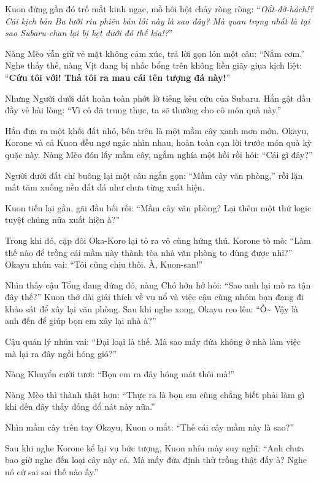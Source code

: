 \documentclass[../main.tex]{subfiles}
\begin{document}

Kuon đứng gần đó trố mắt kinh ngạc, mồ hôi hột chảy ròng ròng: ``\textit{Oắt-đờ-hách!? Cái kịch bản Ba lưỡi rìu phiên bản lỗi này là sao đây? Mà quan trọng nhất là tại sao Subaru-chan lại bị kẹt dưới đó thế kia!?}''

Nàng Mèo vẫn giữ vẻ mặt không cảm xúc, trả lời gọn lỏn một câu: ``Nắm cơm.''
Nghe thấy thế, nàng Vịt đang bị nhấc bổng trên không liền giãy giụa kịch liệt: ``\textbf{Cứu tôi với! Thả tôi ra mau cái tên tượng đá này!}''

Nhưng Người dưới đất hoàn toàn phớt lờ tiếng kêu cứu của Subaru. Hắn gật đầu đầy vẻ hài lòng: ``Vì cô đã trung thực, ta sẽ thưởng cho cô món quà này.''


Hắn đưa ra một khối đất nhỏ, bên trên là một mầm cây xanh mơn mởn. Okayu, Korone và cả Kuon đều ngơ ngác nhìn nhau, hoàn toàn cạn lời trước món quà kỳ quặc này. Nàng Mèo đón lấy mầm cây, ngắm nghía một hồi rồi hỏi: ``Cái gì đây?''

Người dưới đất chỉ buông lại một câu ngắn gọn: ``Mầm cây văn phòng,'' rồi lặn mất tăm xuống nền đất đá như chưa từng xuất hiện.

Kuon tiến lại gần, gãi đầu bối rối: ``Mầm cây văn phòng? Lại thêm một thứ logic tuyệt chủng nữa xuất hiện à?''

Trong khi đó, cặp đôi Oka-Koro lại tỏ ra vô cùng hứng thú. Korone tò mò: ``Làm thế nào để trồng cái mầm này thành tòa nhà văn phòng to đùng được nhỉ?''
Okayu nhún vai: ``Tôi cũng chịu thôi. À, Kuon-san!''

Nhìn thấy cậu Tổng đang đứng đó, nàng Chó hớn hở hỏi: ``Sao anh lại mò ra tận đây thế?'' Kuon thở dài giải thích về vụ nổ và việc cậu cùng nhóm bạn đang đi khảo sát để xây lại văn phòng. Sau khi nghe xong, Okayu reo lên: ``Ồ\~{} Vậy là anh đến để giúp bọn em xây lại nhà à?''

Cậu quản lý nhún vai: ``Đại loại là thế. Mà sao mấy đứa không ở nhà làm việc mà lại ra đây ngồi hóng gió?''

Nàng Khuyển cười tươi: ``Bọn em ra đây hóng mát thôi mà!''

Nàng Mèo thì thành thật hơn: ``Thực ra là bọn em cũng chẳng biết phải làm gì khi đến đây thấy đống đổ nát này nữa.''

Nhìn mầm cây trên tay Okayu, Kuon o mắt: ``Thế cái cây mầm này là sao?''

Sau khi nghe Korone kể lại vụ bức tượng, Kuon nhíu mày suy nghĩ: ``Anh chưa bao giờ nghe đến loại cây này cả. Mà mấy đứa định thử trồng thật đấy à? Nghe nó cứ sai sai thế nào ấy.''
\end{document}
